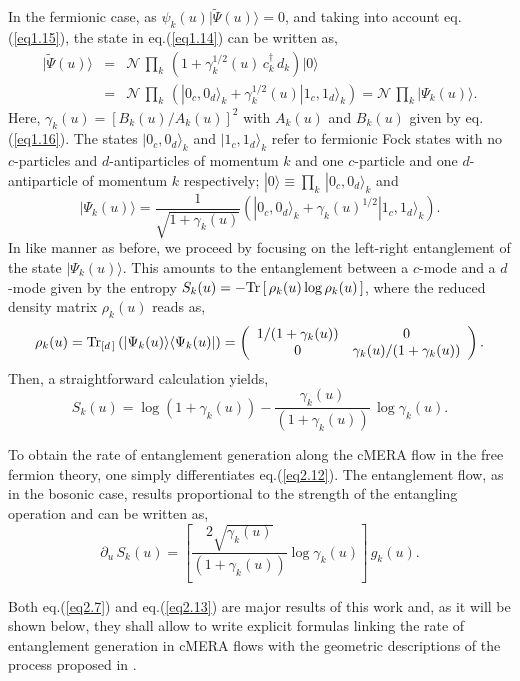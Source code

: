\documentclass[preprint,aps]{revtex4}
\def\barray{\begin{eqnarray}}
\def\earray{\end{eqnarray}}
\def\beq{\begin{equation}}
\def\eeq{\end{equation}}
\begin{document}
In the fermionic case, as $\psi_k(u)|\widetilde{\Psi}(u)\rangle=0$, and taking into account eq.(\ref{eq1.15}), the state in eq.(\ref{eq1.14}) can be written as,
\barray
\label{eq2.9}
|\widetilde{\Psi}(u)\rangle & = & \mathcal{N}\, \prod_k\, \left( 1 + \gamma_k^{1/2}(u)\, c_k^{\dagger}\, d_k\right) |0\rangle \nonumber \\
&=&  \mathcal{N}\, \prod_k\, \left( |0_c, 0_d\rangle_k + \gamma_k^{1/2}(u)|1_c, 1_d\rangle_k\right)= \mathcal{N}\, \prod_k |\Psi_k(u)\rangle. 
\earray
Here, $\gamma_k(u)=\left[B_k(u)/A_k(u)\right]^2 $ with $A_k(u)$ and $B_k(u)$  given by eq.(\ref{eq1.16}). The states $|0_c, 0_d\rangle_k$ and $|1_c, 1_d\rangle_k$ refer to fermionic Fock states with no $c$-particles and $d$-antiparticles of momentum $k$ and one $c$-particle and one $d$-antiparticle of momentum $k$ respectively; $|0\rangle \equiv \prod_k\, |0_c, 0_d\rangle_k$ and
\beq
\label{eq2.10}
|\Psi_k(u)\rangle = \frac{1}{\sqrt{1+\gamma_k(u)}}\left( |0_c, 0_d\rangle_k + \gamma_k(u)^{1/2}|1_c, 1_d\rangle_k\right).
\eeq
In like manner as before, we proceed by focusing on the left-right entanglement of the state $|\Psi_k(u)\rangle$. This amounts to the entanglement between a $c$-mode and a $d$-mode given by the entropy $S_k(u)=-{\rm Tr}\left[\, \rho_k(u)\log \rho_k(u)\, \right]$, where the reduced density matrix $\rho_k(u)$ reads as,
\barray
\label{eq2.11}
 \rho_k(u) = {\rm Tr}_{[d\, ]}\left(|\Psi_k(u)\rangle \langle \Psi_k(u)| \right)  = \left( \begin{array}{cc}
1/(1 + \gamma_k(u)) & 0 \\  
0 & \gamma_k(u)/(1 + \gamma_k(u)) \end{array} \right).
\earray
Then, a straightforward calculation yields,
\beq
\label{eq2.12}
S_k(u) = \log (1 + \gamma_k(u))-\frac{\gamma_k(u)}{(1+\gamma_k(u))}\, \log \gamma_k(u).
\eeq

To obtain the rate of entanglement generation along the cMERA flow in the free fermion theory, one simply differentiates eq.(\ref{eq2.12}). The entanglement flow, as in the bosonic case, results proportional to the strength of the entangling operation and can be written as,
\beq
\label{eq2.13}
\partial_u\, S_k(u) =  \left[\frac{2\sqrt{\gamma_k(u)}}{(1+\gamma_k(u))}\log \gamma_k(u) \right]\, g_k(u).
\eeq

Both eq.(\ref{eq2.7}) and eq.(\ref{eq2.13}) are major results of this work and, as it will be shown below, they shall allow to write explicit formulas linking the rate of entanglement generation in cMERA flows with the geometric descriptions of the process proposed in \cite{taka1}.
\end{document}
